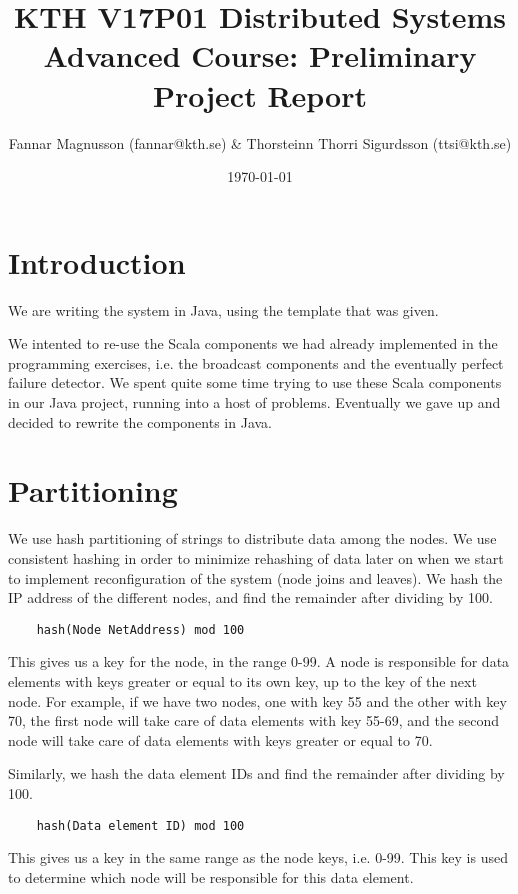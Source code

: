 \documentclass[a4paper, 11pt]{article}
\title{KTH V17P01 Distributed Systems Advanced Course: Preliminary Project Report}
\author{Fannar Magnusson (fannar@kth.se) & Thorsteinn Thorri Sigurdsson (ttsi@kth.se)}
\date{\today{}}
\begin{document}
\maketitle

\section{Introduction}

We are writing the system in Java, using the template that was given.

We intented to re-use the Scala components we had already implemented in the programming exercises, i.e. the broadcast components and the eventually perfect failure detector. We spent quite some time trying to use these Scala components in our Java project, running into a host of problems. Eventually we gave up and decided to rewrite the components in Java. 

\section{Partitioning}

We use hash partitioning of strings to distribute data among the nodes. We use consistent hashing in order to minimize rehashing of data later on when we start to implement reconfiguration of the system (node joins and leaves). We hash the IP address of the different nodes, and find the remainder after dividing by 100.

\begin{verbatim}
    hash(Node NetAddress) mod 100
\end{verbatim}

This gives us a key for the node, in the range 0-99. A node is responsible for data elements with keys greater or equal to its own key, up to the key of the next node. For example, if we have two nodes, one with key 55 and the other with key 70, the first node will take care of data elements with key 55-69, and the second node will take care of data elements with keys greater or equal to 70.

Similarly, we hash the data element IDs and find the remainder after dividing by 100.

\begin{verbatim}
    hash(Data element ID) mod 100
\end{verbatim}

This gives us a key in the same range as the node keys, i.e. 0-99. This key is used to determine which node will be responsible for this data element.
\end{document}
